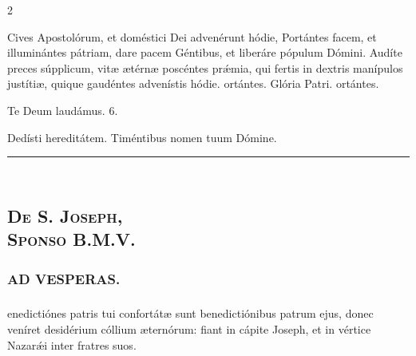 \documentclass[9pt,twoside]{extarticle}
\begin{document}
\begin{multicols}{2}
\begin{tightlist}{}
\item {} Cives Apostolórum, et doméstici Dei advenérunt hódie, \textred{*} Portántes facem, et illuminántes pátriam, dare pacem Géntibus, et liberáre pópulum Dómini.  Audíte preces súpplicum, vitæ ætérnæ poscéntes prǽmia, qui fertis in dextris manípulos justítiæ, quique gaudéntes advenístis hódie. ortántes. Glória Patri. ortántes.
\item Te Deum laudámus. 6.
\item {} Dedísti hereditátem.  Timéntibus nomen tuum Dómine.
\end{tightlist}

\begin{center}\textcolor{red}{\rule{\linewidth}{0.5pt}} \end{center}

\subsection*{\center {}}
\subsection*{\center \textsc{\\ De S. Joseph,\\ Sponso B.M.V.}}
\subsubsection*{\center {}}

\subsubsection*{\center \textsc{AD VESPERAS.}}
\subsubsection*{}
enedictiónes patris tui confortátæ sunt benedictiónibus patrum ejus, donec veníret desidérium cóllium æternórum: fiant in cápite Joseph, et in vértice Nazarǽi inter fratres suos.


\end{multicols}
\end{document}
